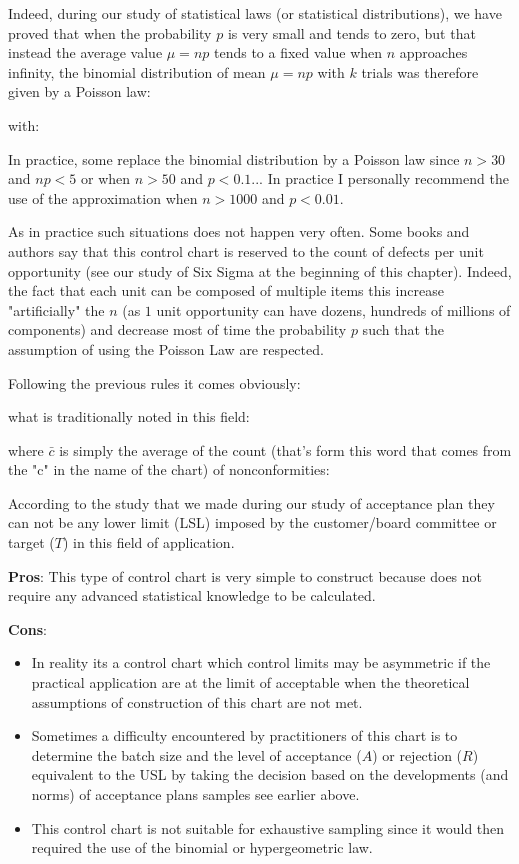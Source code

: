 	Indeed, during our study of statistical laws (or statistical distributions), we have proved that when the probability $p$ is very small and tends to zero, but that instead the average value $\mu=np$ tends to a fixed value when $n$ approaches infinity, the binomial distribution of mean $\mu=np$ with $k$ trials was therefore given by a Poisson law:
	
	with:
	
	In practice, some replace the binomial distribution by a Poisson law since $n>30$ and $np<5$ or when $n>50$ and $p<0.1$... In practice I personally recommend the use of the approximation when $n>1000$ and $p<0.01$.
	
	As in practice such situations does not happen very often. Some books and authors say that this control chart is reserved to the count of defects per unit opportunity (see our study of Six Sigma at the beginning of this chapter). Indeed, the fact that each unit can be composed of multiple items this increase "artificially" the $n$ (as $1$ unit opportunity can have dozens, hundreds of millions of components) and decrease most of time the probability $p$ such that the assumption of using the Poisson Law are respected.
	
	Following the previous rules it comes obviously:
	 
	what is traditionally noted in this field:
	 
	where $\bar{c}$ is simply the average of the count (that's form this word that comes from the "c" in the name of the chart) of nonconformities:
	
	According to the study that we made during our study of acceptance plan they can not be any lower limit (LSL) imposed by the customer/board committee or target ($T$) in this field of application.

	\textbf{Pros}: This type of control chart is very simple to construct because does not require any advanced statistical knowledge to be calculated.

	\textbf{Cons}:
	\begin{itemize}
		\item In reality its a control chart which control limits may be asymmetric if the practical application are at the limit of acceptable when the theoretical assumptions of construction of this chart are not met. 
		
		\item Sometimes a difficulty encountered by practitioners of this chart is to determine the batch size and the level of acceptance ($A$) or rejection ($R$) equivalent to the USL by taking the decision based on the developments (and norms) of acceptance plans samples see earlier above. 
		
		 \item This control chart is not suitable for exhaustive sampling since it would then required the use of the binomial or hypergeometric law. 		\end{itemize}
		 
